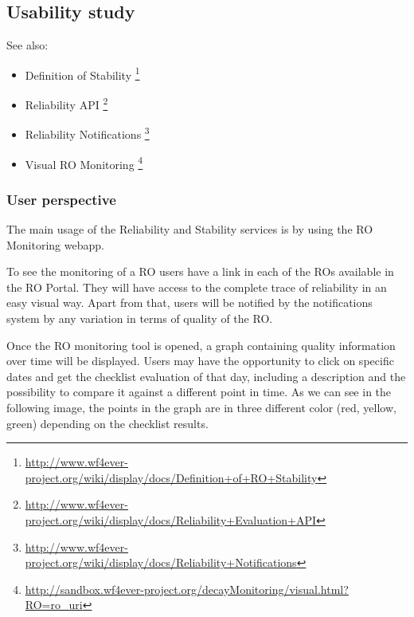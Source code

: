\subsection{Usability study}

See also:

\begin{itemize}
\itemsep1pt\parskip0pt
\item
  Definition of Stability \footnote{\url{http://www.wf4ever-project.org/wiki/display/docs/Definition+of+RO+Stability}}
\item
  Reliability API \footnote{\url{http://www.wf4ever-project.org/wiki/display/docs/Reliability+Evaluation+API}}
\item
  Reliability Notifications \footnote{\url{http://www.wf4ever-project.org/wiki/display/docs/Reliability+Notifications}}
\item
  Visual RO Monitoring \footnote{\url{http://sandbox.wf4ever-project.org/decayMonitoring/visual.html?RO=ro_uri}}
\end{itemize}

\subsubsection{User perspective}

The main usage of the Reliability and Stability services is by using the
RO Monitoring webapp.

To see the monitoring of a RO users have a link in each of the ROs
available in the RO Portal. They will have access to the complete trace
of reliability in an easy visual way. Apart from that, users will be
notified by the notifications system by any variation in terms of
quality of the RO.

Once the RO monitoring tool is opened, a graph containing quality
information over time will be displayed. Users may have the opportunity
to click on specific dates and get the checklist evaluation of that day,
including a description and the possibility to compare it against a
different point in time. As we can see in the following image, the
points in the graph are in three different color (red, yellow, green)
depending on the checklist results.

